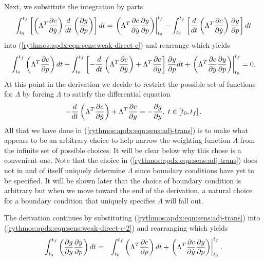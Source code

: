 \documentclass[pdf,ps2pdf,11pt]{SANDreport}
\begin{document}
Next, we substitute the integration by parts
%
\begin{equation}
\int_{t_0}^{t_f} \left[ \left( \Lambda^T \displaystyle{\frac{\partial c}{\partial \dot{y}}} \right) \frac{d}{dt}\left( \displaystyle{\frac{\partial y}{\partial p}} \right) \right] dt
= \left. \left( \Lambda^T \displaystyle{\frac{\partial c}{\partial \dot{y}}} \displaystyle{\frac{\partial y}{\partial p}} \right) \right|_{t_0}^{t_f}
- \int_{t_0}^{t_f} \left[ \frac{d}{dt}\left( \Lambda^T \displaystyle{\frac{\partial c}{\partial \dot{y}}} \right) \displaystyle{\frac{\partial y}{\partial p}} \right] dt
\end{equation}
%
into (\ref{rythmos:apdx:eqn:sens:weak-direct-c}) and rearrange which yields
%
\begin{equation}
\int_{t_0}^{t_f} \left( \Lambda^T \displaystyle{\frac{\partial c}{\partial p}} \right) dt
+ \int_{t_0}^{t_f} \left[
    - \frac{d}{dt}\left( \Lambda^T \displaystyle{\frac{\partial c}{\partial \dot{y}}} \right)
    + \Lambda^T \displaystyle{\frac{\partial c}{\partial y}}
  \right] \displaystyle{\frac{\partial y}{\partial p}} dt
+ \left. \left( \Lambda^T \displaystyle{\frac{\partial c}{\partial \dot{y}}} \displaystyle{\frac{\partial y}{\partial p}} \right) \right|_{t_0}^{t_f}
= 0.
\label{rythmos:apdx:eqn:sens:weak-direct-c-2}
\end{equation}
%
At this point in the derivation we decide to restrict the possible set of
functions for $\Lambda$ by forcing $\Lambda$ to satisfy the differential
equation
%
\begin{equation}
- \frac{d}{dt}\left( \Lambda^T \displaystyle{\frac{\partial c}{\partial \dot{y}}} \right)
+  \Lambda^T \displaystyle{\frac{\partial c}{\partial y}} = - \displaystyle{\frac{\partial g}{\partial y}}, \; t \in \left[ t_0, t_f \right].
\label{rythmos:apdx:eqn:sens:adj-trans}
\end{equation}
%
All that we have done in (\ref{rythmos:apdx:eqn:sens:adj-trans}) is to make
what appears to be an arbitrary choice to help narrow the weighting function
$\Lambda$ from the infinite set of possible choices.  It will be clear below
why this chose is a convenient one.  Note that the choice in
(\ref{rythmos:apdx:eqn:sens:adj-trans}) does not in and of itself uniquely
determine $\Lambda$ since boundary conditions have yet to be specified.  It will
be shown later that the choice of boundary condition is arbitrary but when we
move toward the end of the derivation, a natural choice for a boundary
condition that uniquely specifies $\Lambda$ will fall out.

The derivation continues by substituting
(\ref{rythmos:apdx:eqn:sens:adj-trans}) into
(\ref{rythmos:apdx:eqn:sens:weak-direct-c-2}) and rearranging which yields
%
\begin{eqnarray}
\int_{t_0}^{t_f} \left( \displaystyle{\frac{\partial g}{\partial y}} \displaystyle{\frac{\partial y}{\partial p}} \right) dt
& = &  \int_{t_0}^{t_f} \left( \Lambda^T \displaystyle{\frac{\partial c}{\partial p}} \right) dt
+ \left. \left( \Lambda^T \displaystyle{\frac{\partial c}{\partial \dot{y}}} \displaystyle{\frac{\partial y}{\partial p}} \right) \right|^{t_f}_{t_0}.
\label{rythmos:apdx:eqn:sens:weak-direct-c-3}
\end{eqnarray}
\end{document}

